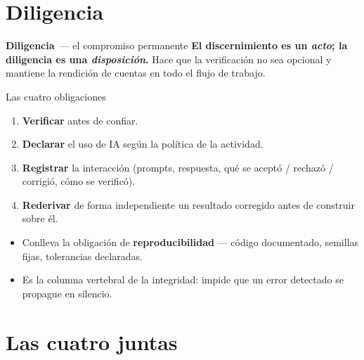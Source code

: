 \documentclass[aspectratio=169,11pt]{beamer}
\newcommand{\Dil}{\textcolor{Cdil}{\textbf{Diligencia}}}
\begin{document}
\section{\texorpdfstring{\textcolor{Cdil}{Diligencia}}{Diligencia}}

\begin{frame}[shrink=25]{\Dil\ --- el compromiso permanente}
  \textbf{El discernimiento es un \emph{acto}; la diligencia es una \emph{disposición}.}
  Hace que la verificación no sea opcional y mantiene la rendición de cuentas en todo el
  flujo de trabajo.
  \vspace{0.5em}
  \begin{block}{Las cuatro obligaciones}
    \begin{enumerate}
      \item \textbf{Verificar} antes de confiar.
      \item \textbf{Declarar} el uso de IA según la política de la actividad.
      \item \textbf{Registrar} la interacción (prompts, respuesta, qué se aceptó /
            rechazó / corrigió, cómo se verificó).
      \item \textbf{Rederivar} de forma independiente un resultado corregido antes de
            construir sobre él.
    \end{enumerate}
  \end{block}
  \begin{itemize}
    \item Conlleva la obligación de \textbf{reproducibilidad} --- código documentado,
          semillas fijas, tolerancias declaradas.
    \item Es la \alert{columna vertebral de la integridad}: impide que un error detectado
          se propague en silencio.
  \end{itemize}
\end{frame}

\section{Las cuatro juntas}
\end{document}
